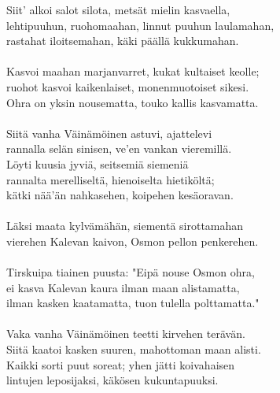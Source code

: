 Siit' alkoi salot silota, metsät mielin kasvaella,              \\
lehtipuuhun, ruohomaahan, linnut puuhun laulamahan,             \\
rastahat iloitsemahan, käki päällä kukkumahan.                  \\
                                                                \\
Kasvoi maahan marjanvarret, kukat kultaiset keolle;             \\
ruohot kasvoi kaikenlaiset, monenmuotoiset sikesi.              \\
Ohra on yksin nousematta, touko kallis kasvamatta.              \\
                                                                \\
Siitä vanha Väinämöinen astuvi, ajattelevi                      \\
rannalla selän sinisen, ve'en vankan vieremillä.                \\
Löyti kuusia jyviä, seitsemiä siemeniä                          \\
rannalta merelliseltä, hienoiselta hietiköltä;                  \\
kätki nää'än nahkasehen, koipehen kesäoravan.                   \\
                                                                \\
Läksi maata kylvämähän, siementä sirottamahan                   \\
vierehen Kalevan kaivon, Osmon pellon penkerehen.               \\
                                                                \\
Tirskuipa tiainen puusta: "Eipä nouse Osmon ohra,               \\
ei kasva Kalevan kaura ilman maan alistamatta,                  \\
ilman kasken kaatamatta, tuon tulella polttamatta."             \\
                                                                \\
Vaka vanha Väinämöinen teetti kirvehen terävän.                 \\
Siitä kaatoi kasken suuren, mahottoman maan alisti.             \\
Kaikki sorti puut soreat; yhen jätti koivahaisen                \\
lintujen leposijaksi, käkösen kukuntapuuksi.                    \\
